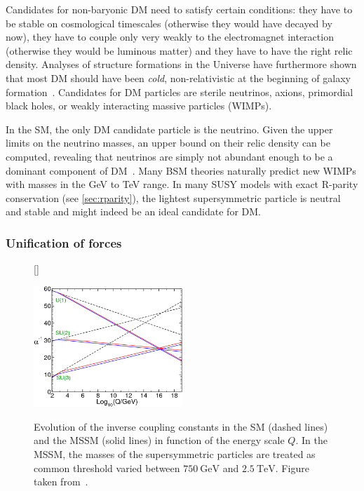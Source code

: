Candidates for non-baryonic DM need to satisfy certain conditions: they have to be stable on cosmological timescales (otherwise they would have decayed by now), they have to couple only very weakly to the electromagnet interaction (otherwise they would be luminous matter) and they have to have the right relic density. Analyses of structure formations in the Universe have furthermore shown that most DM should have been \textit{cold}, \ie non-relativistic at the beginning of galaxy formation~\cite{Bertone:2004pz}. Candidates for DM particles are \eg sterile neutrinos, axions, primordial black holes, or weakly interacting massive particles (WIMPs).

In the SM, the only DM candidate particle is the neutrino. Given the upper limits on the neutrino masses, an upper bound on their relic density can be computed, revealing that neutrinos are simply not abundant enough to be a dominant component of DM~\cite{Bertone:2004pz}. Many BSM theories naturally predict new WIMPs with masses in the GeV to TeV range. In many SUSY models with exact R-parity conservation (see \cref{sec:rparity}), the lightest supersymmetric particle is neutral and stable and might indeed be an ideal candidate for DM.

\subsubsection{Unification of forces}

\begin{figure}
[\FBwidth]
{\caption{Evolution of the inverse coupling constants in the SM (dashed lines) and the MSSM (solid lines) in function of the energy scale $Q$. In the MSSM, the masses of the supersymmetric particles are treated as common threshold varied between $\SI{750}{\GeV}$ and $\SI{2.5}{\TeV}$. Figure taken from~\cite{Martin:1997ns}.}\label{fig:unification_forces}}
{\includegraphics[width=0.5\textwidth]{unification}}
\end{figure}

